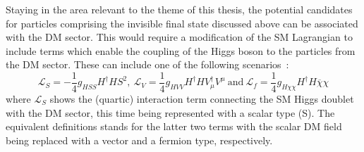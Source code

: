 \hspace{10pt} Staying in the area relevant to the theme of this thesis, the potential candidates for particles comprising the invisible final state discussed above can be associated with the DM sector. This would require a modification of the SM Lagrangian to include terms which enable the coupling of the Higgs boson to the particles from the DM sector. These can include one of the following scenarios~\cite{paper:hinv_run1, paper:hig_portal_models1,yellow_report}:
\begin{equation}
    \mathcal{L}_{S} = -\frac{1}{4}g_{HSS}H^\dagger H S^2,~\mathcal{L}_{V} = \frac{1}{4}g_{HVV}H^\dagger HV_\mu^\dagger V^\mu~\text{and}~\mathcal{L}_{f} = \frac{1}{4}g_{H\chi\chi}H^\dagger H\overline{\chi}\chi
\end{equation}
where $\mathcal{L}_{S}$ shows the (quartic) interaction term connecting the SM Higgs doublet with the DM sector, this time being represented with a scalar type (S). The equivalent definitions stands for the latter two terms with the scalar DM field being replaced with a vector and a fermion type, respectively.




